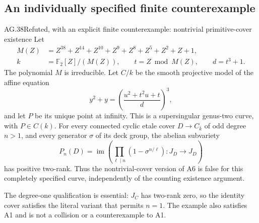 \subsection{An individually specified finite counterexample}

\begin{claim}{AG.38}{Refuted, with an explicit finite counterexample: nontrivial primitive-cover existence}
\label{clm:AGexplicitprimitivecounterexample}
Let
\[
 \begin{split}
 M(Z)&=Z^{38}+Z^{14}+Z^{10}+Z^9+Z^8+Z^5+Z^2+Z+1,\\
 k&=\mathbb F_2[Z]/(M(Z)),\qquad t=Z\bmod M(Z),
 \qquad d=t^3+1.
 \end{split}                                                    \tag{AG.38.1}
\]
The polynomial \(M\) is irreducible. Let \(C/k\) be the smooth
projective model of the affine equation
\[
             y^2+y=\left(\frac{u^2+t^2u+t}{d}\right)^3,
                                                               \tag{AG.38.2}
\]
and let \(P\) be its unique point at infinity. This is a
supersingular genus-two curve, with \(P\in C(k)\).
For every connected cyclic etale cover
\(D\to C_{\bar k}\) of odd degree \(n>1\), and every generator
\(\sigma\) of its deck group, the abelian subvariety
\[
 P_n(D)=\operatorname{im}\left(
       \prod_{\ell\mid n}(1-\sigma^{n/\ell}):J_D\longrightarrow J_D
                              \right)
\]
has positive two-rank. Thus the nontrivial-cover version of A6 is
false for this completely specified curve, independently of the
counting existence argument.

The degree-one qualification is essential: \(J_C\) has two-rank
zero, so the identity cover satisfies the literal variant that
permits \(n=1\). The example also satisfies A1 and is not a
collision or a counterexample to A1.
\end{claim}

